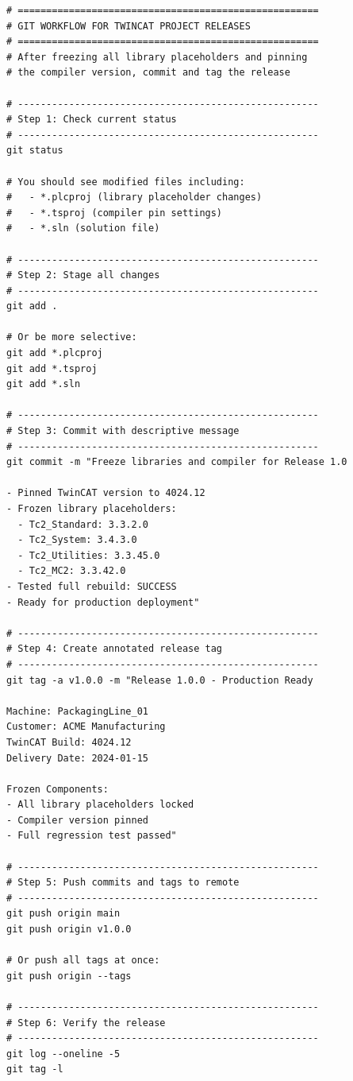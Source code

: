 \documentclass[11pt,a4paper]{article}
\begin{document}
\begin{lstlisting}[style=bashstyle]
# =====================================================
# GIT WORKFLOW FOR TWINCAT PROJECT RELEASES
# =====================================================
# After freezing all library placeholders and pinning
# the compiler version, commit and tag the release

# -----------------------------------------------------
# Step 1: Check current status
# -----------------------------------------------------
git status

# You should see modified files including:
#   - *.plcproj (library placeholder changes)
#   - *.tsproj (compiler pin settings)
#   - *.sln (solution file)

# -----------------------------------------------------
# Step 2: Stage all changes
# -----------------------------------------------------
git add .

# Or be more selective:
git add *.plcproj
git add *.tsproj
git add *.sln

# -----------------------------------------------------
# Step 3: Commit with descriptive message
# -----------------------------------------------------
git commit -m "Freeze libraries and compiler for Release 1.0

- Pinned TwinCAT version to 4024.12
- Frozen library placeholders:
  - Tc2_Standard: 3.3.2.0
  - Tc2_System: 3.4.3.0
  - Tc2_Utilities: 3.3.45.0
  - Tc2_MC2: 3.3.42.0
- Tested full rebuild: SUCCESS
- Ready for production deployment"

# -----------------------------------------------------
# Step 4: Create annotated release tag
# -----------------------------------------------------
git tag -a v1.0.0 -m "Release 1.0.0 - Production Ready

Machine: PackagingLine_01
Customer: ACME Manufacturing
TwinCAT Build: 4024.12
Delivery Date: 2024-01-15

Frozen Components:
- All library placeholders locked
- Compiler version pinned
- Full regression test passed"

# -----------------------------------------------------
# Step 5: Push commits and tags to remote
# -----------------------------------------------------
git push origin main
git push origin v1.0.0

# Or push all tags at once:
git push origin --tags

# -----------------------------------------------------
# Step 6: Verify the release
# -----------------------------------------------------
git log --oneline -5
git tag -l


\end{lstlisting}
\end{document}
